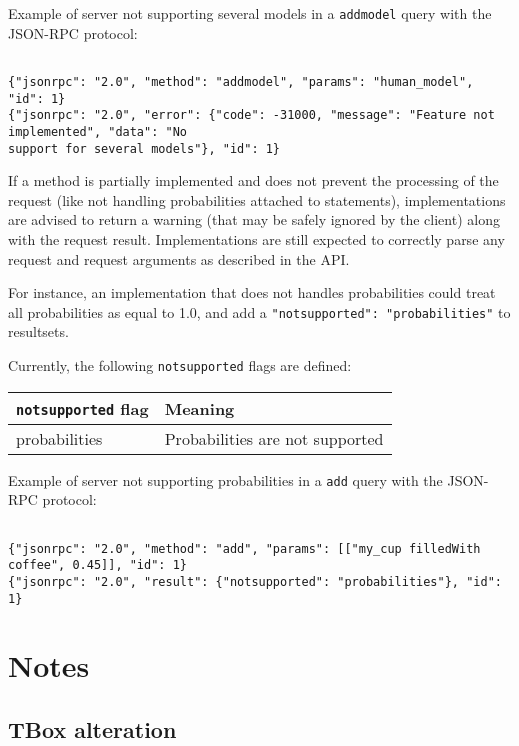 Example of server not supporting several models in a \texttt{addmodel} query with the JSON-RPC protocol:



\small
\begin{verbatim}

{"jsonrpc": "2.0", "method": "addmodel", "params": "human_model", "id": 1}
{"jsonrpc": "2.0", "error": {"code": -31000, "message": "Feature not implemented", "data": "No
support for several models"}, "id": 1}

\end{verbatim}
\normalsize
If a method is partially implemented and does not prevent the processing of the request (like not handling probabilities attached to statements), implementations are advised to return a warning (that may be safely ignored by the client) along with the request result. Implementations are still expected to correctly parse any request and request arguments as described in the API.

For instance, an implementation that does not handles probabilities could treat all probabilities as equal to 1.0, and add a \texttt{{"notsupported": "probabilities"}} to resultsets.

Currently, the following \texttt{notsupported} flags are defined:

\begin{tabular}{ll}
\hline
\texttt{notsupported} flag & Meaning \\ 
\hline
probabilities & Probabilities are not supported \\ 
\hline
\end{tabular}

Example of server not supporting probabilities in a \texttt{add} query with the JSON-RPC protocol:



\small
\begin{verbatim}

{"jsonrpc": "2.0", "method": "add", "params": [["my_cup filledWith coffee", 0.45]], "id": 1}
{"jsonrpc": "2.0", "result": {"notsupported": "probabilities"}, "id": 1}

\end{verbatim}
\normalsize

\section{Notes}
\subsection{TBox alteration}

